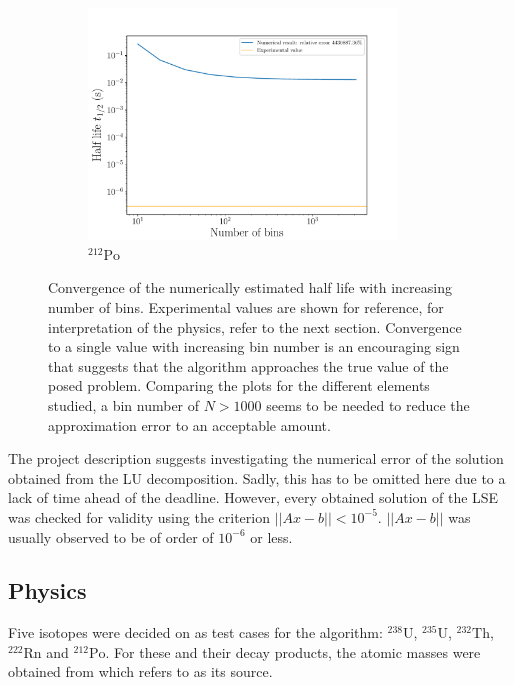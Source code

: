 \documentclass[a4paper,DIV=12,english]{scrartcl}
\begin{document}
\begin{figure}
\begin{subfigure}{0.49\textwidth}
        \includegraphics[width=0.9\textwidth]{../plots/bin_dependence/bins_po212.pdf}
        \caption{$^{212}\text{Po}$}
        \label{subfig:bins_po212}
    \end{subfigure}
    \caption{Convergence of the numerically estimated half life with increasing number of bins. Experimental values are shown for reference, for interpretation of the physics, refer to the next section. Convergence to a single value with increasing bin number is an encouraging sign that suggests that the algorithm approaches the true value of the posed problem. Comparing the plots for the different elements studied, a bin number of $N > 1000$ seems to be needed to reduce the approximation error to an acceptable amount.}
    \label{fig:binsize}
\end{figure}

The project description suggests investigating the numerical error of the solution obtained from the LU decomposition. Sadly, this has to be omitted here due to a lack of time ahead of the deadline. However, every obtained solution of the LSE was checked for validity using the criterion $||Ax - b|| < 10^{-5}$. $||Ax - b||$ was usually observed to be of order of $10^{-6}$ or less.

\subsection{Physics}
Five isotopes were decided on as test cases for the algorithm: $^{238}\text{U}$, $^{235}\text{U}$, $^{232}\text{Th}$, $^{222}\text{Rn}$ and $^{212}\text{Po}$. For these and their decay products, the atomic masses were obtained from \cite{Wolfram} which refers to \cite{Audi} as its source.
\end{document}

